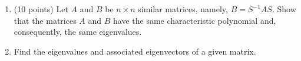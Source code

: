 \documentclass[fleqn]{article}
\begin{document}
  \begin{enumerate}
    \item (10 points) Let $A$ and $B$ be $n \times n$ similar matrices, namely, $B=S^{-1} AS$. Show that the matrices $A$ and $B$ have 
    the same characteristic polynomial and,  consequently, the same eigenvalues.

    \item Find the eigenvalues and associated eigenvectors of a given matrix.
\end{enumerate}
\end{document}
